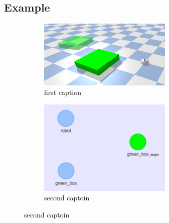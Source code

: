 \subsection{Example}%
\label{subsec:hgraph_example}
\begin{figure}[H]
    \centering

    \begin{subfigure}{.49\textwidth}
    \centering
    \includegraphics[width=0.7\textwidth]{figures/example_hyp_graph/robot_box_and_ghost}
    \caption{first caption}%
    \end{subfigure}
    \hfill
    \begin{subfigure}{.49\textwidth}
    \centering
    \includegraphics[width=0.7\textwidth]{figures/example_hyp_graph/1}
    \caption{second captoin}%
    \end{subfigure}


\end{figure}
